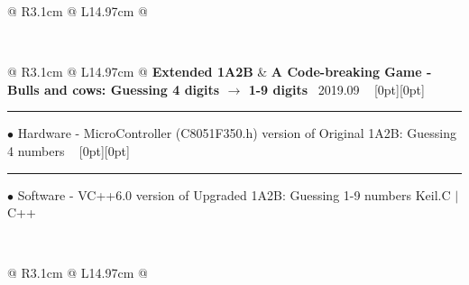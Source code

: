 {{\begin{tabularx}{\linewidth}{@{} R{3.1cm} @{\phantom{d}} L{14.97cm} @{}}
\end{tabularx}
\\
\begin{tabularx}{\linewidth}{@{} R{3.1cm} @{\phantom{d}} L{14.97cm} @{}}
	\textbf{Extended 1A2B} & \hspace{10pt} \textbf{A Code-breaking Game - Bulls and cows: Guessing 4 digits $\to$ 1-9 digits} \hfill \textendash\ 2019.09 \newline \vspace{2pt} \ \hspace{-3pt} \raisebox{0.09\height}[0pt][0pt]{\vrule width0.5pt height30.0pt} \hspace{-0.26em}\rule[0.25em]{1.0em}{0.5pt}\!\! $\bullet$ {\small Hardware - MicroController (C8051F350.h) version of Original 1A2B: Guessing 4 numbers} \newline \vspace{-3pt} \ \hspace{-3pt} \raisebox{0.18\height}[0pt][0pt]{\vrule width0.5pt height15.0pt} \hspace{-0.26em}\rule[0.25em]{1.0em}{0.5pt}\!\! $\bullet$ {\small Software - VC++6.0 version of Upgraded 1A2B: Guessing 1-9 numbers} \hfill {\small \color{color-detail} Keil.C $|$ C++} \href{https://youtu.be/BiX5CQXVdPY}{\raisebox{-0.05\height}{\color{youtube_red!50}\faYoutube}} \href{https://github.com/ChenZhu-Xie/1A2B_3C_4A5B}{\color{black!50}\faGithub} \\ \Gap\Gap\Gap
\end{tabularx}
\\
\begin{tabularx}{\linewidth}{@{} R{3.1cm} @{\phantom{d}} L{14.97cm} @{}}

\end{tabularx}}}
